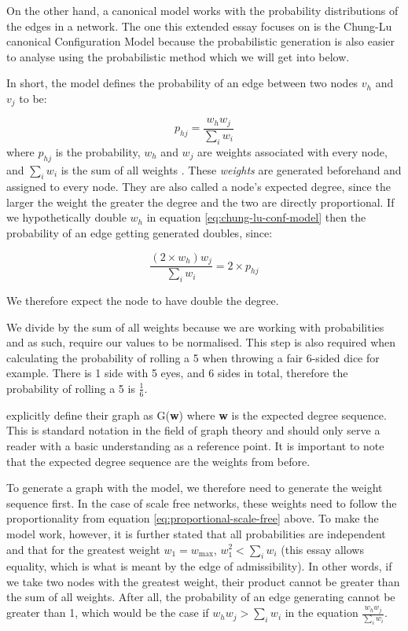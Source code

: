 \documentclass[12pt, a4paper]{article}   %
\begin{document}
On the other hand, a canonical model works with the probability distributions of the edges in a network. The one this extended essay focuses on is the Chung-Lu canonical Configuration Model because the probabilistic generation is also easier to analyse using the probabilistic method which we will get into below. \autocite{ScalefreeNetwork2026}

In short, the model defines the probability of an edge between two nodes \( v_h \) and \( v_j \) to be:

\begin{equation} \label{eq:chung-lu-conf-model}
    p_{hj} = \frac{w_h w_j}{\sum_{i}{w_i}}
\end{equation}
where \( p_{hj} \) is the probability, \( w_h \) and \( w_j\) are weights associated with every node, and \(\sum_{i}{w_i}\) is the sum of all weights \autocite{chungAverageDistancesRandom2002}. These \textit{weights} are generated beforehand and assigned to every node. They are also called a node's expected degree, since the larger the weight the greater the degree and the two are directly proportional. If we hypothetically double \( w_h \) in equation \ref{eq:chung-lu-conf-model} then the probability of an edge getting generated doubles, since:

\[
 \frac{(2 \times w_h) w_j}{\sum_{i}{w_i}} = 2 \times p_{hj}
\]

We therefore expect the node to have double the degree.

We divide by the sum of all weights because we are working with probabilities and as such, require our values to be normalised. This step is also required when calculating the probability of rolling a 5 when throwing a fair 6-sided dice for example. There is 1 side with 5 eyes, and 6 sides in total, therefore the probability of rolling a 5 is \( \frac{1}{6} \). 

\textcite{chungAverageDistancesRandom2002} explicitly define their graph as G(\textbf{w}) where \textbf{w} is the expected degree sequence. This is standard notation in the field of graph theory and should only serve a reader with a basic understanding as a reference point. It is important to note that the expected degree sequence are the weights from before.

To generate a graph with the \textcite{chungAverageDistancesRandom2002} model, we therefore need to generate the weight sequence first. In the case of scale free networks, these weights need to follow the proportionality from equation \ref{eq:proportional-scale-free} above. To make the model work, however, it is further stated that all probabilities are independent and that for the greatest weight \( w_1 = w_{\text{max}} \), \( w_1^2 < \sum_{i}{w_i}\) \autocite{chungAverageDistancesRandom2002} (this essay allows equality, which is what is meant by the edge of admissibility). In other words, if we take two nodes with the greatest weight, their product cannot be greater than the sum of all weights. After all, the probability of an edge generating cannot be greater than 1, which would be the case if \( w_h w_j > \sum_{i}{w_i}\) in the equation \( \frac{w_h w_j}{\sum_{i}{w_i}} \).
\end{document}
